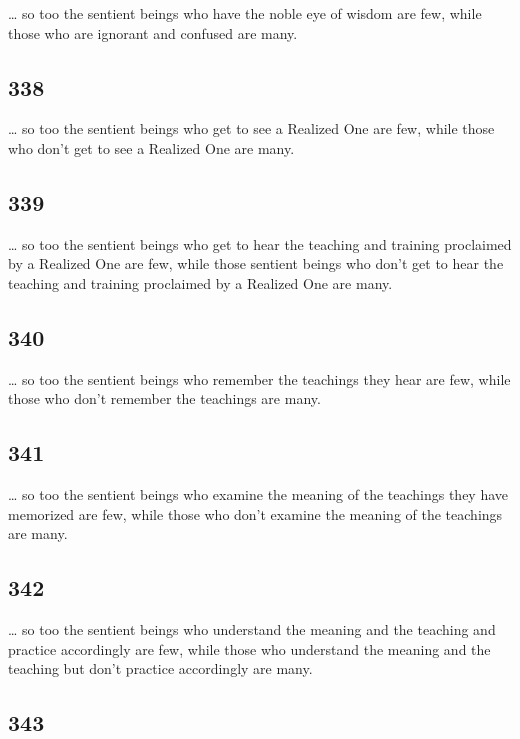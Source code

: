 \documentclass[12pt,openany]{book}%
\begin{document}
… so too the sentient beings who have the noble eye of wisdom are few, while those who are ignorant and confused are many. 

\subsection*{338 }

… so too the sentient beings who get to see a Realized One are few, while those who don’t get to see a Realized One are many. 

\subsection*{339 }

… so too the sentient beings who get to hear the teaching and training proclaimed by a Realized One are few, while those sentient beings who don’t get to hear the teaching and training proclaimed by a Realized One are many. 

\subsection*{340 }

… so too the sentient beings who remember the teachings they hear are few, while those who don’t remember the teachings are many. 

\subsection*{341 }

… so too the sentient beings who examine the meaning of the teachings they have memorized are few, while those who don’t examine the meaning of the teachings are many. 

\subsection*{342 }

… so too the sentient beings who understand the meaning and the teaching and practice accordingly are few, while those who understand the meaning and the teaching but don’t practice accordingly are many. 

\subsection*{343 }
\end{document}
